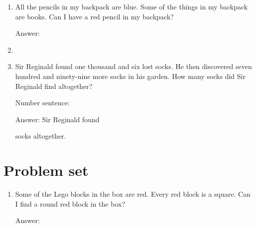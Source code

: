 \documentclass{tufte-book}
\begin{document}
\begin{enumerate}

\item All the pencils in my backpack are blue. Some of the things in my backpack are books. Can I have a red pencil in my backpack?\medskip\par
Answer: \dotfill\medskip

\item \item Sir Reginald found one thousand and six lost socks. He then discovered seven hundred and ninety-nine more socks in his garden. 
How many socks did Sir Reginald find altogether?\medskip\par
Number sentence: \dotfill\medskip\par
Answer: Sir Reginald found 
\dotfill\medskip\par\mbox{}\dotfill\medskip\par\mbox{}\dotfill\bigskip
 socks altogether.

\end{enumerate}

\clearpage\section{Problem set }

\begin{enumerate}

\item Some of the Lego blocks in the box are red. Every red block is a square. Can I find a round red block in the box?\medskip\par
Answer: \dotfill\medskip


\end{enumerate}
\end{document}
